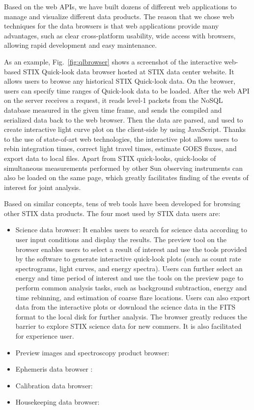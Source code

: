 \documentclass{aa}
\begin{document}
Based on the web APIs, we have built dozens of different web applications to manage and visualize 
different data products. 
The reason that we chose web techniques for the data browsers is that
web applications provide many advantages, such as clear cross-platform usability, 
wide access with browsers, allowing rapid development and easy maintenance. 

As an example, 
Fig.~\ref{fig:qlbrowser} shows a screenshot of the interactive web-based STIX Quick-look data browser hosted 
at STIX data center website.  It allows users to browse any historical STIX Quick-look data.
On the browser, users can specify time ranges of Quick-look data to be loaded.
After the web API on the server receives  a request, 
it reads level-1 packets from the NoSQL database measured in the given time frame, and sends the
compiled and serialized data  back to the web browser. 
Then the data are parsed, and used to  create interactive light curve plot on the client-side by using JavaScript.
Thanks to the use of state-of-art web technologies, the interactive plot allows users  
to rebin integration times, correct light travel times, estimate GOES fluxes, and export data to local files. 
Apart from STIX quick-looks, quick-looks of 
simultaneous measurements performed by other Sun observing instruments
can also be loaded on the same page, which greatly facilitates finding of the 
events of interest for joint analysis. 

Based on similar concepts, tens of web tools have been developed for 
browsing other STIX data products. 
The four most used by STIX data users are: 
\begin{itemize}
  \item  Science data browser:
  It enables users to search for science data according to user input 
  conditions and display the results. The preview tool on the browser 
  enables users to select a result of interest and use the tools provided 
  by the software to generate interactive quick-look plots (such as 
  count rate spectrograms, light curves, and energy spectra). 
  Users can further select an energy and time period of interest 
  and use the tools on the preview page to perform common analysis tasks,  
  such as background subtraction, energy and time rebinning, and estimation 
  of coarse flare locations.  Users can also export data from the interactive plots or 
  download the science data in the FITS format to the local disk for further analysis. 
  The browser greatly reduces the barrier to explore STIX science data for new commers. It is also facilitated
  for  experience user. 
  \item  Preview images and spectroscopy product browser:
  \item  Ephemeris data browser : 
  \item  Calibration data browser: 
  \item  Housekeeping data browser: 
\end{itemize}
\end{document}
